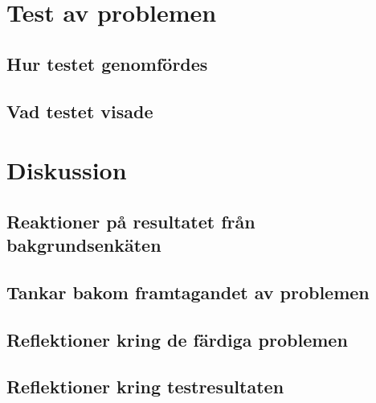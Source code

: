 \documentclass[11pt,a4paper]{article}
\begin{document}
\section{Test av problemen}
    \label{sec:testavproblemen}
    
\todo{!}
    
    \subsection{Hur testet genomfördes}
        
        
    \subsection{Vad testet visade}
    \label{sec:slutenkat}
    

\section{Diskussion}
    

    \subsection{Reaktioner på resultatet från bakgrundsenkäten}
        
    
    \subsection{Tankar bakom framtagandet av problemen}
        \label{sec:tankarbakomprob}
        
        
        
        
    \subsection{Reflektioner kring de färdiga problemen}
        

    \subsection{Reflektioner kring testresultaten}
        
    
\end{document}
